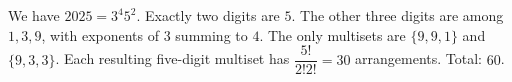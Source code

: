 We have $2025=3^4 5^2$. Exactly two digits are $5$. The other three digits are among $1,3,9$, with exponents of $3$ summing to $4$. The only multisets are $\{9,9,1\}$ and $\{9,3,3\}$. Each resulting five-digit multiset has $\dfrac{5!}{2!2!}=30$ arrangements. Total: $\boxed{60}$.
